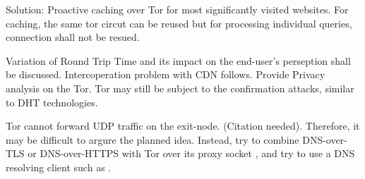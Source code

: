 Solution: Proactive caching \cite{cohen2003proactive} over Tor for most significantly visited websites. For caching, the same tor circut can be reused but for processing individual queries, connection shall not be resued.

Variation of Round Trip Time and its impact on the end-user's perseption shall be discussed. Intercoperation problem with CDN follows.
Provide Privacy analysis on the Tor. Tor may still be subject to the confirmation attacks, similar to DHT technologies. 

Tor cannot forward UDP traffic on the exit-node. (Citation needed). Therefore, it may be difficult to argure the planned idea.
Instead, try to combine DNS-over-TLS or DNS-over-HTTPS with Tor over its proxy socket \cite{tor-socks}, and try to use a DNS resolving client such as \cite{technitium-configuration}. 